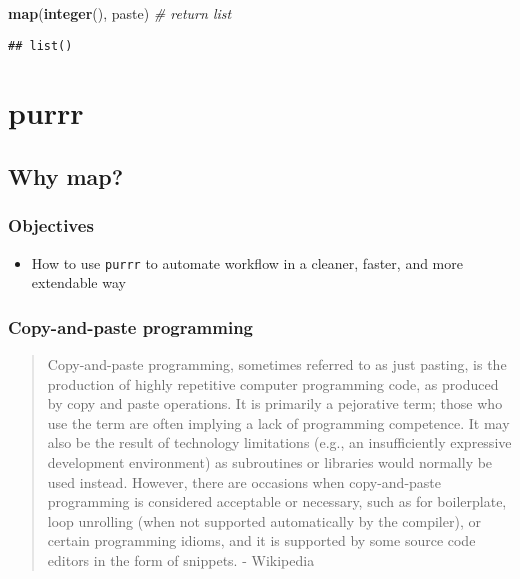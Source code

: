 \documentclass[
]{book}
\newenvironment{Shaded}{\begin{snugshade}}{\end{snugshade}}
\newcommand{\CommentTok}[1]{\textcolor[rgb]{0.56,0.35,0.01}{\textit{#1}}}
\newcommand{\KeywordTok}[1]{\textcolor[rgb]{0.13,0.29,0.53}{\textbf{#1}}}
\newcommand{\NormalTok}[1]{#1}
\providecommand{\tightlist}{%
  \setlength{\itemsep}{0pt}\setlength{\parskip}{0pt}}
\begin{document}
\begin{Shaded}
\begin{Highlighting}[]
\KeywordTok{map}\NormalTok{(}\KeywordTok{integer}\NormalTok{(), paste) }\CommentTok{\# return list}
\end{Highlighting}
\end{Shaded}

\begin{verbatim}
## list()
\end{verbatim}

\hypertarget{purrr}{%
\section{purrr}\label{purrr}}

\hypertarget{why-map}{%
\subsection{Why map?}\label{why-map}}

\hypertarget{objectives-1}{%
\subsubsection{Objectives}\label{objectives-1}}

\begin{itemize}
\tightlist
\item
  How to use \texttt{purrr} to automate workflow in a cleaner, faster, and more extendable way
\end{itemize}

\hypertarget{copy-and-paste-programming}{%
\subsubsection{Copy-and-paste programming}\label{copy-and-paste-programming}}

\begin{quote}
Copy-and-paste programming, sometimes referred to as just pasting, is the production of highly repetitive computer programming code, as produced by copy and paste operations. It is primarily a pejorative term; those who use the term are often implying a lack of programming competence. It may also be the result of technology limitations (e.g., an insufficiently expressive development environment) as subroutines or libraries would normally be used instead. However, there are occasions when copy-and-paste programming is considered acceptable or necessary, such as for boilerplate, loop unrolling (when not supported automatically by the compiler), or certain programming idioms, and it is supported by some source code editors in the form of snippets. - Wikipedia
\end{quote}
\end{document}
